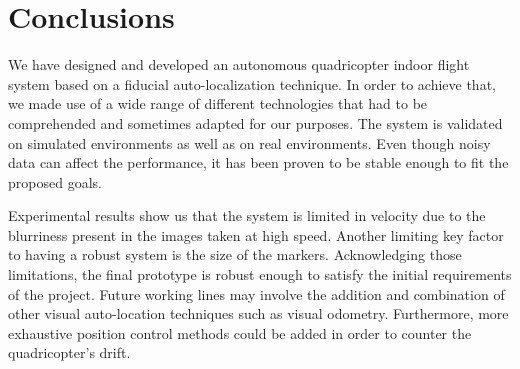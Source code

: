 \documentclass{styles/svproc}
\begin{document}
\section{Conclusions}

	We have designed and developed an autonomous quadricopter indoor flight system based on a fiducial auto-localization technique. In order to achieve that, we made use of a wide range of different technologies that had to be comprehended and sometimes adapted for our purposes. The system is validated on simulated environments as well as on real environments. Even though noisy data can affect the performance, it has been proven to be stable enough to fit the proposed goals.
	
	Experimental results show us that the system is limited in velocity due to the blurriness present in the images taken at high speed. Another limiting key factor to having a robust system is the size of the markers. Acknowledging those limitations, the final prototype is robust enough to satisfy the initial requirements of the project. Future working lines may involve the addition and combination of other visual auto-location techniques such as visual odometry. Furthermore, more exhaustive position control methods could be added in order to counter the quadricopter's drift.
\end{document}
